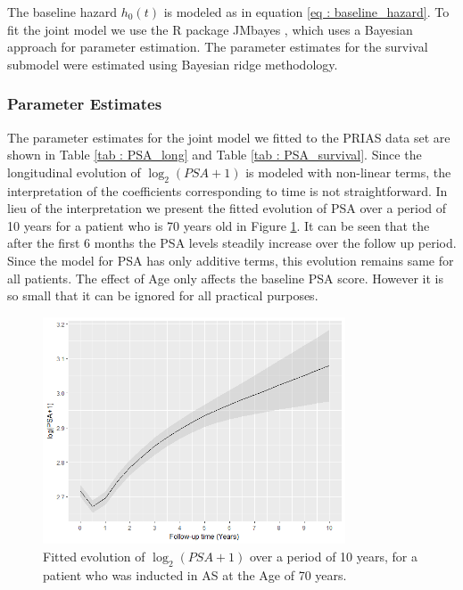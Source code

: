 The baseline hazard $h_0(t)$ is modeled as in equation \ref{eq : baseline_hazard}. To fit the joint model we use the R package JMbayes \cite{rizopoulosJMbayes}, which uses a Bayesian approach for parameter estimation. The parameter estimates for the survival submodel were estimated using Bayesian ridge methodology.

\subsubsection{Parameter Estimates}
The parameter estimates for the joint model we fitted to the PRIAS data set are shown in Table \ref{tab : PSA_long} and Table \ref{tab : PSA_survival}. Since the longitudinal evolution of $\log_2(PSA + 1)$ is modeled with non-linear terms, the interpretation of the coefficients corresponding to time is not straightforward. In lieu of the interpretation we present the fitted evolution of PSA over a period of 10 years for a patient who is 70 years old in Figure \ref{fig : fitted_trend_psa}. It can be seen that the after the first 6 months the PSA levels steadily increase over the follow up period. Since the model for PSA has only additive terms, this evolution remains same for all patients. The effect of Age only affects the baseline PSA score. However it is so small that it can be ignored for all practical purposes.\\

\begin{figure}[!htb]
	\centering
    \captionsetup{justification=centering}
	\includegraphics[width=0.8\textwidth]{fitted_trend_psa.png}
	\caption{Fitted evolution of $\log_2(PSA+1)$ over a period of 10 years, for a patient who was inducted in AS at the Age of 70 years.}
	\label{fig : fitted_trend_psa}
\end{figure}

